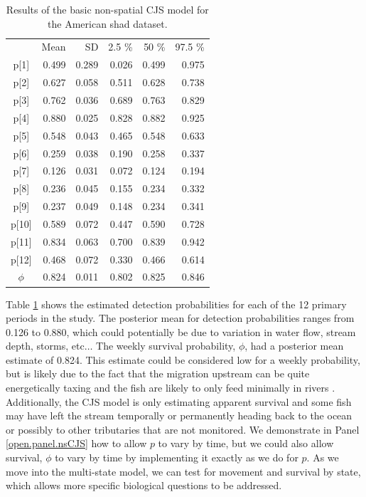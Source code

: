\begin{table}
\centering
\caption{Results of the basic non-spatial CJS model for the American shad dataset.
}
\begin{tabular}{crrrrr}
\hline \hline
&    Mean   &  SD  &  2.5 \%   &   50 \%    &  97.5 \% \\
p[1] & 0.499 & 0.289 & 0.026 & 0.499 & 0.975 \\
p[2] & 0.627 & 0.058 & 0.511 & 0.628 & 0.738 \\
p[3] & 0.762 & 0.036 & 0.689 & 0.763 & 0.829 \\
p[4] & 0.880 & 0.025 & 0.828 & 0.882 & 0.925 \\
p[5] & 0.548 & 0.043 & 0.465 & 0.548 & 0.633 \\
p[6] & 0.259 & 0.038 & 0.190 & 0.258 & 0.337 \\
p[7] & 0.126 & 0.031 & 0.072 & 0.124 & 0.194 \\
p[8] & 0.236 & 0.045 & 0.155 & 0.234 & 0.332 \\
p[9] & 0.237 & 0.049 & 0.148 & 0.234 & 0.341 \\
p[10]& 0.589 & 0.072 & 0.447 & 0.590 & 0.728  \\
p[11]& 0.834 & 0.063 & 0.700 & 0.839 & 0.942 \\
p[12]& 0.468 & 0.072 & 0.330 & 0.466 & 0.614 \\
$\phi$  & 0.824 & 0.011 & 0.802 & 0.825 & 0.846 \\
\hline
\end{tabular}
\label{open.tab.simple-shad}
\end{table}

Table \ref{open.tab.simple-shad} shows the estimated detection
probabilities for each of the 12 primary periods in the study.  The
posterior mean for detection probabilities ranges from 0.126 to 0.880,
which could potentially be due to variation in water flow, stream
depth, storms, etc$\dots$ The weekly survival probability, $\phi$, had
a posterior mean estimate of 0.824.  This estimate could be considered
low for a weekly probability, but is likely due to the fact that the
migration upstream can be quite energetically taxing and the fish are
likely to only feed minimally in rivers
\citep{leggett_carscadden:1978, leonard_mccormick:1999}.
Additionally, the CJS model is only estimating apparent survival and
some fish may have left the stream temporally or permanently heading
back to the ocean or possibly to other tributaries that are not
monitored.  We demonstrate in Panel \ref{open.panel.nsCJS} how to
allow $p$ to vary by time, but we could also allow survival, $\phi$ to
vary by time by implementing it exactly as we do for $p$.  As we move
into the multi-state model, we can test for movement and survival by
state, which allows more specific biological questions to be
addressed.


